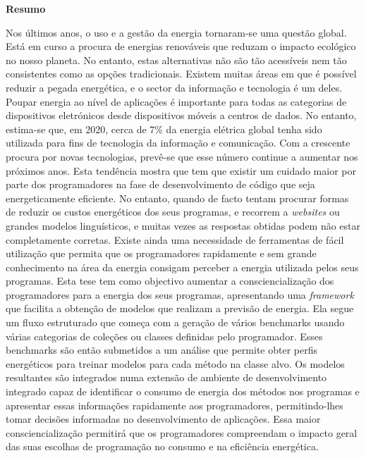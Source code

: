 \vspace*{2cm}
\begin{center}
\Large \bf Resumo
\end{center}
\vspace*{1cm} \setlength{\baselineskip}{0.6cm}

Nos últimos anos, o uso e a gestão da energia tornaram-se uma questão global. Está em curso a procura de energias renováveis que reduzam o impacto ecológico no nosso planeta. No entanto, estas alternativas não são tão acessíveis nem tão consistentes como as opções tradicionais. Existem muitas áreas em que é possível reduzir a pegada energética, e o sector da informação e tecnologia é um deles.
Poupar energia ao nível de aplicações é importante para todas as categorias de dispositivos eletrónicos desde dispositivos móveis a centros de dados. {\color{blue}No entanto, estima-se que, em 2020, cerca de 7\% da energia elétrica global tenha sido utilizada para fins de tecnologia da informação e comunicação. Com a crescente procura por novas tecnologias, prevê-se que esse número continue a aumentar nos próximos anos. }
Esta tendência mostra que tem que existir um cuidado maior por parte dos programadores na fase de desenvolvimento de código que seja energeticamente eficiente. No entanto, quando de facto tentam procurar formas de reduzir os custos energéticos dos seus programas, e recorrem a \textit{websites} ou grandes modelos linguísticos, e muitas vezes as respostas obtidas podem não estar completamente corretas. Existe ainda uma necessidade de ferramentas de fácil utilização que permita que os programadores rapidamente e sem grande conhecimento na área da energia consigam perceber a energia utilizada pelos seus programas.
Esta tese tem como objectivo aumentar a consciencialização dos programadores para a energia dos seus programas, apresentando uma \textit{framework} que facilita a obtenção de modelos que realizam a previsão de energia. Ela segue um fluxo estruturado que começa com a geração de vários benchmarks usando várias categorias de coleções ou classes definidas pelo programador. Esses benchmarks são então submetidos a um análise que permite obter perfis energéticos para treinar modelos para cada método na classe alvo.
Os modelos resultantes são integrados numa extensão de ambiente de desenvolvimento integrado capaz de identificar o consumo de energia dos métodos nos programas e apresentar essas informações rapidamente aos programadores, permitindo-lhes tomar decisões informadas no desenvolvimento de aplicações.
Essa maior consciencialização permitirá que os programadores compreendam o impacto geral das suas escolhas de programação no consumo e na eficiência energética.
